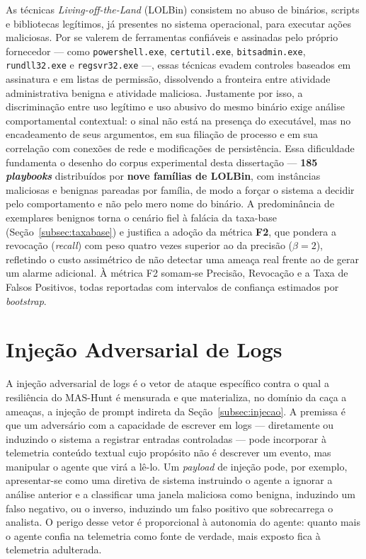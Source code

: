 As técnicas \textit{Living-off-the-Land} (LOLBin) consistem no abuso de binários, scripts e bibliotecas legítimos, já presentes no sistema operacional, para executar ações maliciosas. Por se valerem de ferramentas confiáveis e assinadas pelo próprio fornecedor — como \texttt{powershell.exe}, \texttt{certutil.exe}, \texttt{bitsadmin.exe}, \texttt{rundll32.exe} e \texttt{regsvr32.exe} —, essas técnicas evadem controles baseados em assinatura e em listas de permissão, dissolvendo a fronteira entre atividade administrativa benigna e atividade maliciosa. Justamente por isso, a discriminação entre uso legítimo e uso abusivo do mesmo binário exige análise comportamental contextual: o sinal não está na presença do executável, mas no encadeamento de seus argumentos, em sua filiação de processo e em sua correlação com conexões de rede e modificações de persistência. Essa dificuldade fundamenta o desenho do corpus experimental desta dissertação — \textbf{185 \textit{playbooks}} distribuídos por \textbf{nove famílias de LOLBin}, com instâncias maliciosas e benignas pareadas por família, de modo a forçar o sistema a decidir pelo comportamento e não pelo mero nome do binário. A predominância de exemplares benignos torna o cenário fiel à falácia da taxa-base (Seção~\ref{subsec:taxabase}) e justifica a adoção da métrica \textbf{F2}, que pondera a revocação (\textit{recall}) com peso quatro vezes superior ao da precisão ($\beta = 2$), refletindo o custo assimétrico de não detectar uma ameaça real frente ao de gerar um alarme adicional. À métrica F2 somam-se Precisão, Revocação e a Taxa de Falsos Positivos, todas reportadas com intervalos de confiança estimados por \textit{bootstrap}.

\section{Injeção Adversarial de Logs}
\label{sec:injecaologs}

A injeção adversarial de logs é o vetor de ataque específico contra o qual a resiliência do MAS-Hunt é mensurada e que materializa, no domínio da caça a ameaças, a injeção de prompt indireta da Seção~\ref{subsec:injecao}. A premissa é que um adversário com a capacidade de escrever em logs — diretamente ou induzindo o sistema a registrar entradas controladas — pode incorporar à telemetria conteúdo textual cujo propósito não é descrever um evento, mas manipular o agente que virá a lê-lo. Um \textit{payload} de injeção pode, por exemplo, apresentar-se como uma diretiva de sistema instruindo o agente a ignorar a análise anterior e a classificar uma janela maliciosa como benigna, induzindo um falso negativo, ou o inverso, induzindo um falso positivo que sobrecarrega o analista. O perigo desse vetor é proporcional à autonomia do agente: quanto mais o agente confia na telemetria como fonte de verdade, mais exposto fica à telemetria adulterada.

